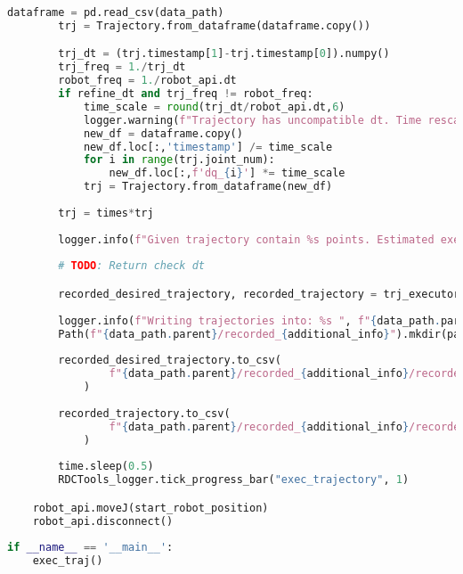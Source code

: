 \begin{lstlisting}[language=python, caption=\raggedright{execution/exec\_trajectory.py}, frame=single]
        dataframe = pd.read_csv(data_path)  
        trj = Trajectory.from_dataframe(dataframe.copy())

        trj_dt = (trj.timestamp[1]-trj.timestamp[0]).numpy()
        trj_freq = 1./trj_dt
        robot_freq = 1./robot_api.dt
        if refine_dt and trj_freq != robot_freq:
            time_scale = round(trj_dt/robot_api.dt,6)
            logger.warning(f"Trajectory has uncompatible dt. Time rescaled from trj freq: {trj_freq} to robot freq: {robot_freq}, velocity will be multiplied on: {time_scale}")
            new_df = dataframe.copy()
            new_df.loc[:,'timestamp'] /= time_scale
            for i in range(trj.joint_num):
                new_df.loc[:,f'dq_{i}'] *= time_scale
            trj = Trajectory.from_dataframe(new_df)
        
        trj = times*trj
            
        logger.info(f"Given trajectory contain %s points. Estimated execution time: %s s", str(trj.shape[0]), str(trj.shape[0]*robot_api.dt))
        
        # TODO: Return check dt

        recorded_desired_trajectory, recorded_trajectory = trj_executor.execute_trajectory(trj, check_dt=refine_dt, check=check)
        
        logger.info(f"Writing trajectories into: %s ", f"{data_path.parent}/recorded_{additional_info}")
        Path(f"{data_path.parent}/recorded_{additional_info}").mkdir(parents=True, exist_ok=True)
       
        recorded_desired_trajectory.to_csv(
                f"{data_path.parent}/recorded_{additional_info}/recorded_desired_trajectory.csv", index=False
            )
        
        recorded_trajectory.to_csv(
                f"{data_path.parent}/recorded_{additional_info}/recorded_trajectory.csv", index=False
            )
        
        time.sleep(0.5)
        RDCTools_logger.tick_progress_bar("exec_trajectory", 1)

    robot_api.moveJ(start_robot_position)
    robot_api.disconnect()
    
if __name__ == '__main__':
    exec_traj()

\end{lstlisting}